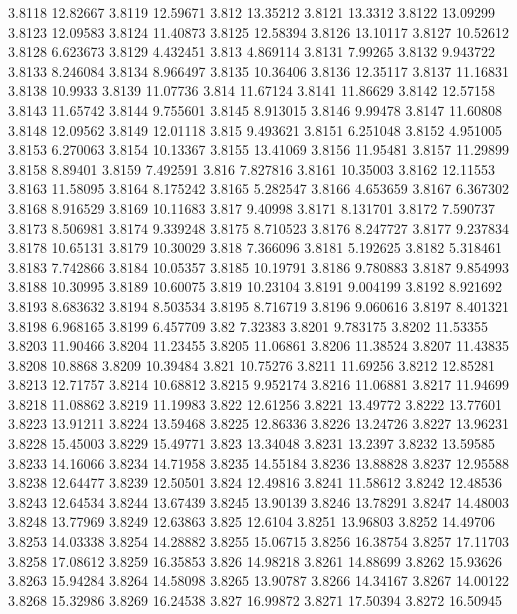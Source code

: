 3.8118  12.82667
3.8119  12.59671
3.812  13.35212
3.8121  13.3312
3.8122  13.09299
3.8123  12.09583
3.8124  11.40873
3.8125  12.58394
3.8126  13.10117
3.8127  10.52612
3.8128  6.623673
3.8129  4.432451
3.813  4.869114
3.8131  7.99265
3.8132  9.943722
3.8133  8.246084
3.8134  8.966497
3.8135  10.36406
3.8136  12.35117
3.8137  11.16831
3.8138  10.9933
3.8139  11.07736
3.814  11.67124
3.8141  11.86629
3.8142  12.57158
3.8143  11.65742
3.8144  9.755601
3.8145  8.913015
3.8146  9.99478
3.8147  11.60808
3.8148  12.09562
3.8149  12.01118
3.815  9.493621
3.8151  6.251048
3.8152  4.951005
3.8153  6.270063
3.8154  10.13367
3.8155  13.41069
3.8156  11.95481
3.8157  11.29899
3.8158  8.89401
3.8159  7.492591
3.816  7.827816
3.8161  10.35003
3.8162  12.11553
3.8163  11.58095
3.8164  8.175242
3.8165  5.282547
3.8166  4.653659
3.8167  6.367302
3.8168  8.916529
3.8169  10.11683
3.817  9.40998
3.8171  8.131701
3.8172  7.590737
3.8173  8.506981
3.8174  9.339248
3.8175  8.710523
3.8176  8.247727
3.8177  9.237834
3.8178  10.65131
3.8179  10.30029
3.818  7.366096
3.8181  5.192625
3.8182  5.318461
3.8183  7.742866
3.8184  10.05357
3.8185  10.19791
3.8186  9.780883
3.8187  9.854993
3.8188  10.30995
3.8189  10.60075
3.819  10.23104
3.8191  9.004199
3.8192  8.921692
3.8193  8.683632
3.8194  8.503534
3.8195  8.716719
3.8196  9.060616
3.8197  8.401321
3.8198  6.968165
3.8199  6.457709
3.82  7.32383
3.8201  9.783175
3.8202  11.53355
3.8203  11.90466
3.8204  11.23455
3.8205  11.06861
3.8206  11.38524
3.8207  11.43835
3.8208  10.8868
3.8209  10.39484
3.821  10.75276
3.8211  11.69256
3.8212  12.85281
3.8213  12.71757
3.8214  10.68812
3.8215  9.952174
3.8216  11.06881
3.8217  11.94699
3.8218  11.08862
3.8219  11.19983
3.822  12.61256
3.8221  13.49772
3.8222  13.77601
3.8223  13.91211
3.8224  13.59468
3.8225  12.86336
3.8226  13.24726
3.8227  13.96231
3.8228  15.45003
3.8229  15.49771
3.823  13.34048
3.8231  13.2397
3.8232  13.59585
3.8233  14.16066
3.8234  14.71958
3.8235  14.55184
3.8236  13.88828
3.8237  12.95588
3.8238  12.64477
3.8239  12.50501
3.824  12.49816
3.8241  11.58612
3.8242  12.48536
3.8243  12.64534
3.8244  13.67439
3.8245  13.90139
3.8246  13.78291
3.8247  14.48003
3.8248  13.77969
3.8249  12.63863
3.825  12.6104
3.8251  13.96803
3.8252  14.49706
3.8253  14.03338
3.8254  14.28882
3.8255  15.06715
3.8256  16.38754
3.8257  17.11703
3.8258  17.08612
3.8259  16.35853
3.826  14.98218
3.8261  14.88699
3.8262  15.93626
3.8263  15.94284
3.8264  14.58098
3.8265  13.90787
3.8266  14.34167
3.8267  14.00122
3.8268  15.32986
3.8269  16.24538
3.827  16.99872
3.8271  17.50394
3.8272  16.50945
